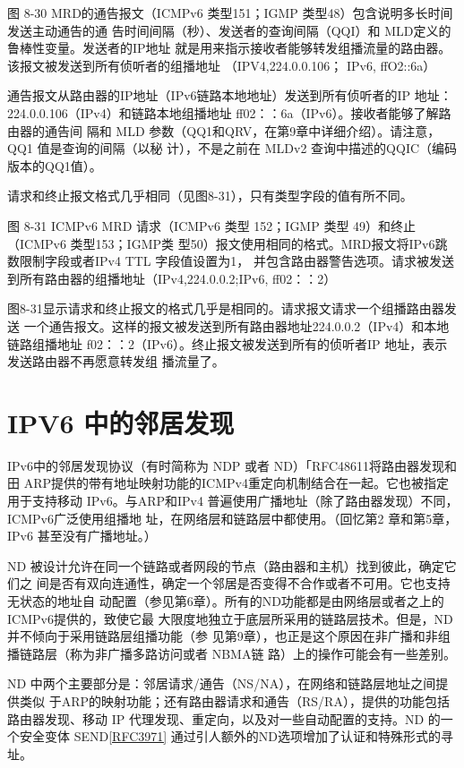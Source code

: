 图 8-30 MRD的通告报文（ICMPv6 类型151；IGMP 类型48）包含说明多长时间发送主动通告的通
告时间间隔（秒）、发送者的查询间隔（QQI）和 MLD定义的鲁棒性变量。发送者的IP地址
就是用来指示接收者能够转发组播流量的路由器。该报文被发送到所有侦听者的组播地址
（IPV4,224.0.0.106； IPv6, ffO2::6a）

通告报文从路由器的IP地址（IPv6链路本地地址）发送到所有侦听者的IP 地址：
224.0.0.106（IPv4）和链路本地组播地址 ff02：：6a（IPv6）。接收者能够了解路由器的通告间
隔和 MLD 参数（QQ1和QRV，在第9章中详细介绍）。请注意，QQ1 值是查询的间隔（以秘
计），不是之前在 MLDv2 查询中描述的QQIC（编码版本的QQ1值）。

请求和终止报文格式几乎相同（见图8-31），只有类型字段的值有所不同。

图 8-31
ICMPv6 MRD 请求（ICMPv6 类型 152；IGMP 类型 49）和终止（ICMPv6 类型153；IGMP类
型50）报文使用相同的格式。MRD报文将IPv6跳数限制字段或者IPv4 TTL 字段值设置为1，
并包含路由器警告选项。请求被发送到所有路由器的组播地址（IPv4,224.0.0.2;IPv6, ff02：：2）

图8-31显示请求和终止报文的格式几乎是相同的。请求报文请求一个组播路由器发送
一个通告报文。这样的报文被发送到所有路由器地址224.0.0.2（IPv4）和本地链路组播地址
f02：：2（IPv6）。终止报文被发送到所有的侦听者IP 地址，表示发送路由器不再愿意转发组
播流量了。

\section{IPV6 中的邻居发现}

IPv6中的邻居发现协议（有时简称为 NDP 或者 ND）「RFC48611将路由器发现和田
ARP提供的带有地址映射功能的ICMPv4重定向机制结合在一起。它也被指定用于支持移动
IPv6。与ARP和IPv4 普遍使用广播地址（除了路由器发现）不同，ICMPv6广泛使用组播地
址，在网络层和链路层中都使用。（回忆第2 章和第5章，IPv6 甚至没有广播地址。）

ND 被设计允许在同一个链路或者网段的节点（路由器和主机）找到彼此，确定它们之
间是否有双向连通性，确定一个邻居是否变得不合作或者不可用。它也支持无状态的地址自
动配置（参见第6章）。所有的ND功能都是由网络层或者之上的ICMPv6提供的，致使它最
大限度地独立于底层所采用的链路层技术。但是，ND 并不倾向于采用链路层组播功能（参
见第9章），也正是这个原因在非广播和非组播链路层（称为非广播多路访问或者 NBMA链
路）上的操作可能会有一些差别。

ND 中两个主要部分是：邻居请求/通告（NS/NA），在网络和链路层地址之间提供类似
于ARP的映射功能；还有路由器请求和通告（RS/RA），提供的功能包括路由器发现、移动
IP 代理发现、重定向，以及对一些自动配置的支持。ND 的一个安全变体 SEND\href{https://www.rfc-editor.org/rfc/rfc3971}{[RFC3971]}
通过引人额外的ND选项增加了认证和特殊形式的寻址。

